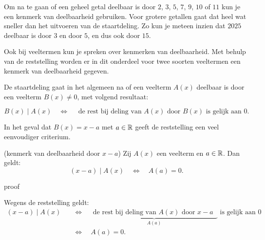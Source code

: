 \documentclass{ximera}
\begin{document}
	\author{Koen de Naeghel - Wiskunde Op Maat}
    \xmsource


Om na te gaan of een geheel getal deelbaar is door \(2\), \(3\), \(5\), \(7\), \(9\), \(10\) of \(11\) kun je een kenmerk van deelbaarheid gebruiken. Voor grotere getallen gaat dat heel wat sneller dan het uitvoeren van de staartdeling. Zo kun je meteen inzien dat \(2025\) deelbaar is door \(3\) en door \(5\), en dus ook door \(15\).  

Ook bij veeltermen kun je spreken over kenmerken van deelbaarheid. Met behulp van de reststelling worden er in dit onderdeel voor twee soorten veeltermen een kenmerk van deelbaarheid gegeven. 

De staartdeling gaat in het algemeen na of een veelterm \(A(x)\) deelbaar is door een veelterm \(B(x) \neq 0\), met volgend resultaat:

\[
B(x) \mid A(x) \quad \Leftrightarrow \quad \text{ de rest bij deling van \(A(x)\) door \(B(x)\) is gelijk aan \(0\).}
\] 

In het geval dat \(B(x) = x-a\) met \(a \in \mathbb{R}\) geeft de reststelling een veel eenvoudiger criterium.

\begin{theorem}(kenmerk van deelbaarheid door \(x-a\))
Zij \(A(x)\) een veelterm en \(a \in \mathbb{R}\). Dan geldt:
\[
(x-a) \mid A(x) \quad \Leftrightarrow \quad A(a) = 0.
\]
\end{theorem} 


\begin{expandable}{proof}{}

Wegens de reststelling geldt:
\begin{align}
(x-a) \mid A(x) \quad 
& \Leftrightarrow \quad \underbrace{\text{ de rest bij deling van \(A(x)\) door \(x-a\) }}_{A(a)} \text{ is gelijk aan \(0\)} \nonumber \\
& \Leftrightarrow \quad A(a) = 0. %
\end{align}

\end{expandable}
\end{document}

